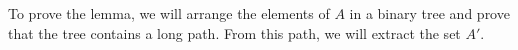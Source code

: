      



To prove the lemma, we will arrange the elements of $A$ in a binary tree
and prove that the tree contains a long path. From this path, we will 
extract the set $A'$. 

